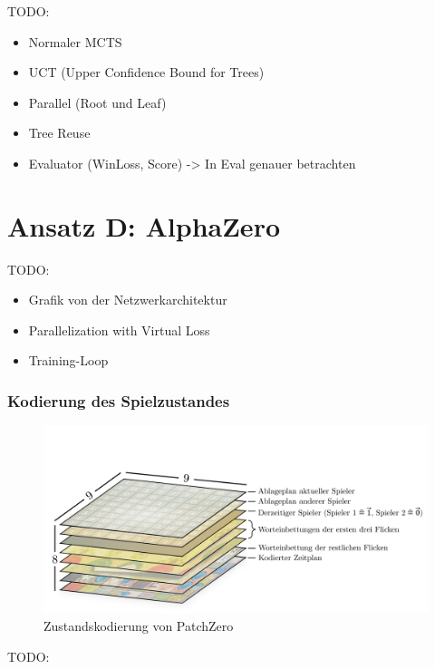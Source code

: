 TODO:

\begin{itemize}
    \item Normaler MCTS
    \item UCT (Upper Confidence Bound for Trees)
    \item Parallel (Root und Leaf)
    \item Tree Reuse
    \item Evaluator (WinLoss, Score) -> In Eval genauer betrachten
\end{itemize}

\section{Ansatz D: AlphaZero}
\label{section:erstellung-ansatz-d}

TODO:

\begin{itemize}
    \item Grafik von der Netzwerkarchitektur
    \item Parallelization with Virtual Loss
    \item Training-Loop
\end{itemize}

\subsubsection*{Kodierung des Spielzustandes}

\begin{figure}[!ht]
    \centering
    \vspace*{-1.75cm}
    \includegraphics[width=\textwidth]{res/pictures/patch-zero-state.pdf}
    \caption{Zustandskodierung von PatchZero}
    \label{fig:patch-zero-state}
\end{figure}

TODO:

